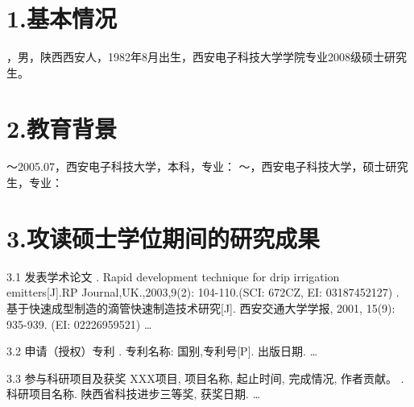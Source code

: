 \begin{resume}
\section*{1.\hspace{0.75em}基本情况}
，男，陕西西安人，1982年8月出生，西安电子科技大学学院专业2008级硕士研究生。
\section*{2.\hspace{0.75em}教育背景}
\begin{resumelist*}
～2005.07，西安电子科技大学，本科，专业：
～\phantom{2005.07}，西安电子科技大学，硕士研究生，专业：
\end{resumelist*}
\section*{3.\hspace{0.75em}攻读硕士学位期间的研究成果}
\begin{resumelist}{\hspace{-0.25em}3.1\hspace{0.5em} 发表学术论文}
\resumelistitem {}. Rapid development technique for drip irrigation emitters[J].RP Journal,UK.,2003,9(2): 104-110.(SCI: 672CZ, EI: 03187452127)
\resumelistitem {}. 基于快速成型制造的滴管快速制造技术研究[J]. 西安交通大学学报, 2001, 15(9): 935-939. (EI: 02226959521)
\resumelistitem \ldots
\end{resumelist}
\begin{resumelist}{\hspace{-0.25em}3.2\hspace{0.5em} 申请（授权）专利}
\resumelistitem {}. 专利名称: 国别,专利号[P]. 出版日期.
\resumelistitem \ldots
\end{resumelist}
\begin{resumelist}{\hspace{-0.25em}3.3\hspace{0.5em} 参与科研项目及获奖}
\resumelistitem XXX项目, 项目名称, 起止时间, 完成情况, 作者贡献。
\resumelistitem {}. 科研项目名称. 陕西省科技进步三等奖, 获奖日期.
\resumelistitem \ldots
\end{resumelist}
\end{resume}
